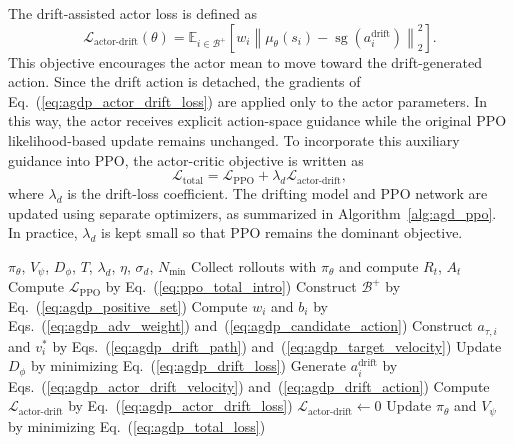\documentclass[conference]{IEEEtran}
\begin{document}
The drift-assisted actor loss is defined as
\begin{equation}
\label{eq:agdp_actor_drift_loss}
    \mathcal{L}_{\mathrm{actor\text{-}drift}}(\theta)
    =
    \mathbb{E}_{i\in\mathcal{B}^{+}}
    \left[
    w_i
    \left\|
    \mu_{\theta}(s_i)
    -
    \operatorname{sg}
    \left(
    a_i^{\mathrm{drift}}
    \right)
    \right\|_2^2
    \right].
\end{equation}
This objective encourages the actor mean to move toward the drift-generated action. Since the drift action is detached, the gradients of Eq.~(\ref{eq:agdp_actor_drift_loss}) are applied only to the actor parameters. In this way, the actor receives explicit action-space guidance while the original PPO likelihood-based update remains unchanged. To incorporate this auxiliary guidance into PPO, the actor-critic objective is written as
\begin{equation}
\label{eq:agdp_total_loss}
    \mathcal{L}_{\mathrm{total}}
    =
    \mathcal{L}_{\mathrm{PPO}}
    +
    \lambda_d
    \mathcal{L}_{\mathrm{actor\text{-}drift}},
\end{equation}
where $\lambda_d$ is the drift-loss coefficient. The drifting model and PPO network are updated using separate optimizers, as summarized in Algorithm~\ref{alg:agd_ppo}. In practice, $\lambda_d$ is kept small so that PPO remains the dominant objective.



\begin{algorithm}[t]
\caption{Advantage-Guided Drift-Assisted PPO}
\label{alg:agd_ppo}
\small
\begin{algorithmic}[1]
\Require $\pi_{\theta}$, $V_{\psi}$, $D_{\phi}$, $T$, $\lambda_d$, $\eta$, $\sigma_d$, $N_{\min}$
    \State Collect rollouts with $\pi_{\theta}$ and compute $R_t$, $A_t$
        \State Compute $\mathcal{L}_{\mathrm{PPO}}$ by Eq.~(\ref{eq:ppo_total_intro})
        \State Construct $\mathcal{B}^{+}$ by Eq.~(\ref{eq:agdp_positive_set})
            \State Compute $w_i$ and $b_i$ by Eqs.~(\ref{eq:agdp_adv_weight}) and~(\ref{eq:agdp_candidate_action})
            \State Construct $a_{\tau,i}$ and $v_i^{*}$ by Eqs.~(\ref{eq:agdp_drift_path}) and~(\ref{eq:agdp_target_velocity})
            \State Update $D_{\phi}$ by minimizing Eq.~(\ref{eq:agdp_drift_loss})
            \State Generate $a_i^{\mathrm{drift}}$ by Eqs.~(\ref{eq:agdp_actor_drift_velocity}) and~(\ref{eq:agdp_drift_action})
            \State Compute $\mathcal{L}_{\mathrm{actor\text{-}drift}}$ by Eq.~(\ref{eq:agdp_actor_drift_loss})
        \Else
            \State $\mathcal{L}_{\mathrm{actor\text{-}drift}}\leftarrow 0$
        \EndIf
        \State Update $\pi_{\theta}$ and $V_{\psi}$ by minimizing Eq.~(\ref{eq:agdp_total_loss})
    \EndFor
\EndFor
\end{algorithmic}
\end{algorithm}
\end{document}
